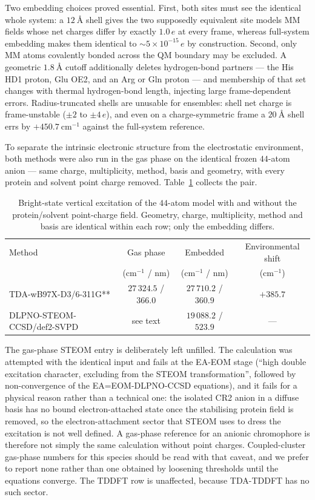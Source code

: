 \documentclass[journal=jpcbfk, manuscript=article, layout=twocolumn, doi=true]{achemso}
\begin{document}
Two embedding choices proved essential. First, both sites must see the
identical whole system: a $12~\text{\AA}$ shell gives the two supposedly
equivalent site models MM fields whose net charges differ by exactly
$1.0\,e$ at every frame, whereas full-system embedding makes them
identical to $\sim\!5\times10^{-15}\,e$ by construction. Second, only MM atoms
covalently bonded across the QM boundary may be excluded. A geometric
$1.8~\text{\AA}$ cutoff additionally deletes hydrogen-bond partners --- the
His HD1 proton, Glu OE2, and an Arg or Gln proton --- and membership of that
set changes with thermal hydrogen-bond length, injecting large
frame-dependent errors. Radius-truncated shells are unusable for ensembles:
shell net charge is frame-unstable ($\pm2$ to $\pm4\,e$), and even on a
charge-symmetric frame a $20~\text{\AA}$ shell errs by $+450.7~\mathrm{cm^{-1}}$
against the full-system reference.

To separate the intrinsic electronic structure from the electrostatic
environment, both methods were also run in the gas phase on the identical
frozen $44$-atom anion --- same charge, multiplicity, method, basis and
geometry, with every protein and solvent point charge removed.
Table~\ref{tab:gasphase} collects the pair.

\begin{table}[t]
\centering
\caption{Bright-state vertical excitation of the $44$-atom model with and
without the protein/solvent point-charge field. Geometry, charge,
multiplicity, method and basis are identical within each row; only the
embedding differs.}
\label{tab:gasphase}
\begin{tabular}{lccc}
\toprule
Method & Gas phase & Embedded & Environmental shift \\
       & (cm$^{-1}$ / nm) & (cm$^{-1}$ / nm) & (cm$^{-1}$) \\
\midrule
TDA-wB97X-D3/6-311G** & $27\,324.5$ / $366.0$ & $27\,710.2$ / $360.9$ & $+385.7$ \\
DLPNO-STEOM-CCSD/def2-SVPD & see text & $19\,088.2$ / $523.9$ & --- \\
\bottomrule
\end{tabular}
\end{table}

The gas-phase STEOM entry is deliberately left unfilled. The calculation was
attempted with the identical input and fails at the EA-EOM stage
(``high double excitation character, excluding from the STEOM transformation'',
followed by non-convergence of the EA=EOM-DLPNO-CCSD equations), and it fails
for a physical reason rather than a technical one: the isolated CR2 anion in a
diffuse basis has no bound electron-attached state once the stabilising protein
field is removed, so the electron-attachment sector that STEOM uses to dress
the excitation is not well defined. A gas-phase reference for an anionic
chromophore is therefore not simply the same calculation without point charges.
Coupled-cluster gas-phase numbers for this species should be read with that
caveat, and we prefer to report none rather than one obtained by loosening
thresholds until the equations converge. The TDDFT row is unaffected, because
TDA-TDDFT has no such sector.
\end{document}
